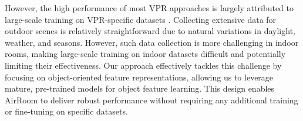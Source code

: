 However, the high performance of most VPR approaches is largely attributed to large-scale training on VPR-specific datasets \cite{keetha2023anylocuniversalvisualplace}. Collecting extensive data for outdoor scenes is relatively straightforward due to natural variations in daylight, weather, and seasons. However, such data collection is more challenging in indoor rooms, making large-scale training on indoor datasets difficult and potentially limiting their effectiveness.
Our approach effectively tackles this challenge by focusing on object-oriented feature representations, allowing us to leverage mature, pre-trained models for object feature learning. This design enables AirRoom to deliver robust performance without requiring any additional training or fine-tuning on specific datasets.
